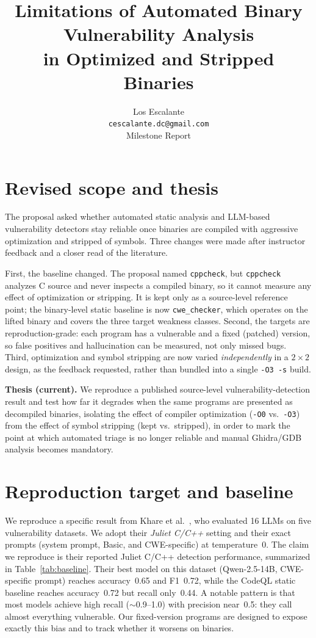 \documentclass[10pt]{article}
\title{Limitations of Automated Binary Vulnerability Analysis\\in Optimized and Stripped Binaries}
\author{Los Escalante \\ \texttt{cescalante.dc@gmail.com} \\ Milestone Report}
\date{}
\begin{document}
\maketitle

\section{Revised scope and thesis}
The proposal asked whether automated static analysis and LLM-based vulnerability
detectors stay reliable once binaries are compiled with aggressive optimization
and stripped of symbols. Three changes were made after instructor feedback and a
closer read of the literature.

First, the baseline changed. The proposal named \texttt{cppcheck}, but
\texttt{cppcheck} analyzes C source and never inspects a compiled binary, so it
cannot measure any effect of optimization or stripping. It is kept only as a
source-level reference point; the binary-level static baseline is now
\texttt{cwe\_checker}, which operates on the lifted binary and covers the three
target weakness classes. Second, the targets are reproduction-grade:
each program has a vulnerable and a fixed (patched) version, so false positives
and hallucination can be measured, not only missed bugs. Third, optimization and
symbol stripping are now varied \emph{independently} in a $2\times2$ design, as
the feedback requested, rather than bundled into a single \texttt{-O3 -s} build.

\textbf{Thesis (current).} We reproduce a published source-level
vulnerability-detection result and test how far it degrades when the same
programs are presented as decompiled binaries, isolating the effect of compiler
optimization (\texttt{-O0} vs.\ \texttt{-O3}) from the effect of symbol stripping
(kept vs.\ stripped), in order to mark the point at which automated triage is no
longer reliable and manual Ghidra/GDB analysis becomes mandatory.

\section{Reproduction target and baseline}
We reproduce a specific result from Khare et al.~\cite{khare2024}, who evaluated
16 LLMs on five vulnerability datasets. We adopt their \emph{Juliet C/C++}
setting and their exact prompts (system prompt, Basic, and CWE-specific) at
temperature~0. The claim we reproduce is their reported Juliet C/C++ detection
performance, summarized in Table~\ref{tab:baseline}. Their best model on this
dataset (Qwen-2.5-14B, CWE-specific prompt) reaches accuracy~0.65 and F1~0.72,
while the CodeQL static baseline reaches accuracy~0.72 but recall only~0.44.
A notable pattern is that most models achieve high recall ($\sim$0.9--1.0) with
precision near~0.5: they call almost everything vulnerable. Our fixed-version
programs are designed to expose exactly this bias and to track whether it worsens
on binaries.
\end{document}
